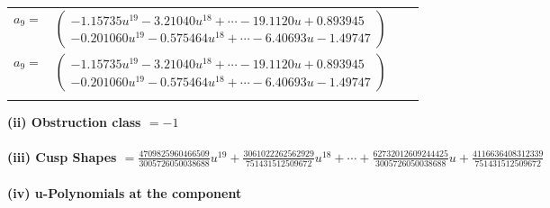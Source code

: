\documentclass[1p]{elsarticle_modified}
\theoremstyle{definition}
\begin{document}
\begin{tabular}{m{7pt} m{180pt} m{7pt} m{180pt} }
\flushright $a_{9}=$&$\begin{pmatrix}-1.15735 u^{19}-3.21040 u^{18}+\cdots-19.1120 u+0.893945\\-0.201060 u^{19}-0.575464 u^{18}+\cdots-6.40693 u-1.49747\end{pmatrix}$\\ \flushright $a_{9}=$&$\begin{pmatrix}-1.15735 u^{19}-3.21040 u^{18}+\cdots-19.1120 u+0.893945\\-0.201060 u^{19}-0.575464 u^{18}+\cdots-6.40693 u-1.49747\end{pmatrix}$\\&\end{tabular}
\flushleft \textbf{(ii) Obstruction class $= -1$}\\~\\
\flushleft \textbf{(iii) Cusp Shapes $= \frac{4709825960466509}{3005726050038688} u^{19}+\frac{3061022262562929}{751431512509672} u^{18}+\cdots+\frac{62732012609244425}{3005726050038688} u+\frac{4116636408312339}{751431512509672}$}\\~\\
\newpage\renewcommand{\arraystretch}{1}
\flushleft \textbf{(iv) u-Polynomials at the component}\newline \\
\end{document}
